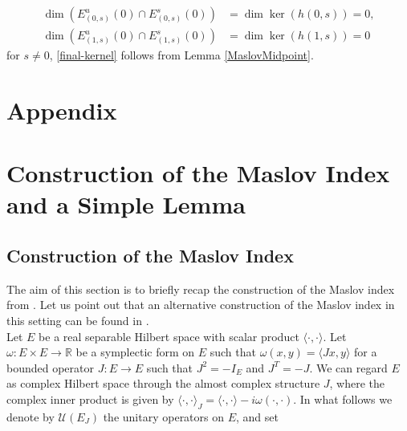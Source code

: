 \documentclass[a4paper,10pt]{article}
\begin{document}
\begin{align*}
\dim(E^u_{(0,s)}(0)\cap E^s_{(0,s)}(0))&=\dim\ker(h(0,s))=0,\\
\dim(E^u_{(1,s)}(0)\cap E^s_{(1,s)}(0))&=\dim\ker(h(1,s))=0
\end{align*}
for $s\neq 0$, \eqref{final-kernel} follows from Lemma \ref{MaslovMidpoint}.



\appendix

\section*{Appendix}


\section{Construction of the Maslov Index and a Simple Lemma}\label{app-Maslov}

\subsection{Construction of the Maslov Index}
The aim of this section is to briefly recap the construction of the Maslov index from \cite{Furutani}. Let us point out that an alternative construction of the Maslov index in this setting can be found in \cite{Hermann}.\\
Let $E$ be a real separable Hilbert space with scalar product $\langle\cdot,\cdot\rangle$. Let $\omega:E\times E\rightarrow\mathbb{R}$ be a symplectic form on $E$ such that $\omega(x,y)=\langle Jx,y\rangle$ for a bounded operator $J:E\rightarrow E$ such that $J^{2}=-I_E$ and $J^T=-J$. We can regard $E$ as complex Hilbert space through the almost complex structure $J$, where the complex inner product is given by $\langle\cdot,\cdot\rangle_J=\langle\cdot,\cdot\rangle-i\omega(\cdot,\cdot)$. In what follows we denote by $\mathcal{U}(E_J)$ the unitary operators on $E$, and set
\end{document}
